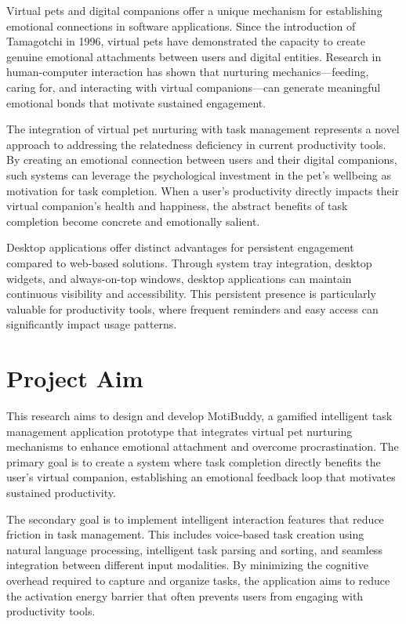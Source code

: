 Virtual pets and digital companions offer a unique mechanism for establishing emotional connections in software applications. Since the introduction of Tamagotchi in 1996, virtual pets have demonstrated the capacity to create genuine emotional attachments between users and digital entities. Research in human-computer interaction has shown that nurturing mechanics---feeding, caring for, and interacting with virtual companions---can generate meaningful emotional bonds that motivate sustained engagement.

The integration of virtual pet nurturing with task management represents a novel approach to addressing the relatedness deficiency in current productivity tools. By creating an emotional connection between users and their digital companions, such systems can leverage the psychological investment in the pet's wellbeing as motivation for task completion. When a user's productivity directly impacts their virtual companion's health and happiness, the abstract benefits of task completion become concrete and emotionally salient.

Desktop applications offer distinct advantages for persistent engagement compared to web-based solutions. Through system tray integration, desktop widgets, and always-on-top windows, desktop applications can maintain continuous visibility and accessibility. This persistent presence is particularly valuable for productivity tools, where frequent reminders and easy access can significantly impact usage patterns.

\section{Project Aim}
\label{sec:aim}

This research aims to design and develop MotiBuddy, a gamified intelligent task management application prototype that integrates virtual pet nurturing mechanisms to enhance emotional attachment and overcome procrastination. The primary goal is to create a system where task completion directly benefits the user's virtual companion, establishing an emotional feedback loop that motivates sustained productivity.

The secondary goal is to implement intelligent interaction features that reduce friction in task management. This includes voice-based task creation using natural language processing, intelligent task parsing and sorting, and seamless integration between different input modalities. By minimizing the cognitive overhead required to capture and organize tasks, the application aims to reduce the activation energy barrier that often prevents users from engaging with productivity tools.

